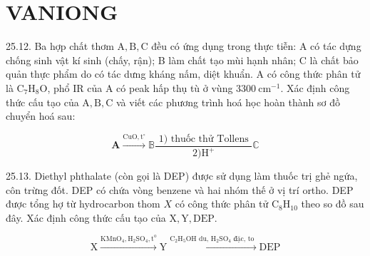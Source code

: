\documentclass[10pt]{article}
\begin{document}
\section*{VANIONG}
25.12. Ba hợp chất thơm $\mathrm{A}, \mathrm{B}, \mathrm{C}$ đều có ứng dụng trong thực tiễn: A có tác dựng chống sinh vật kí sinh (chấy, rận); B làm chất tạo mùi hạnh nhân; C là chất bảo quản thực phẩm do có tác dưng kháng nấm, diệt khuẩn. A có công thức phân tử là $\mathrm{C}_{7} \mathrm{H}_{8} \mathrm{O}$, phổ IR của A có peak hấp thụ tù ở vùng $3300 \mathrm{~cm}^{-1}$. Xác định công thức cấu tạo của $\mathrm{A}, \mathrm{B}, \mathrm{C}$ và viết các phương trình hoá học hoàn thành sơ đồ chuyển hoá sau:

$$
\mathbf{A} \xrightarrow{\mathrm{CuO}, \mathrm{t}^{\circ}} \mathbb{B} \frac{\text { 1) thuốc thử Tollens }}{2) \mathrm{H}^{+}} \mathbb{C}
$$

25.13. Diethyl phthalate (còn gọi là DEP) được sử dụng làm thuốc trị ghẻ ngứa, côn trừng đốt. DEP có chứa vòng benzene và hai nhóm thế ở vị trí ortho. DEP được tổng hợ từ hydrocarbon thom $X$ có công thức phân tử $\mathrm{C}_{8} \mathrm{H}_{10}$ theo so đồ sau đây. Xác định công thức cấu tạo của $\mathrm{X}, \mathrm{Y}, \mathrm{DEP}$.

$$
\mathrm{X} \xrightarrow{\mathrm{KMnO}_{4}, \mathrm{H}_{2} \mathrm{SO}_{4}, \mathrm{t}^{\mathrm{o}}} \mathrm{Y} \xrightarrow{\mathrm{C}_{2} \mathrm{H}_{5} \mathrm{OH} \text { du, } \mathrm{H}_{2} \mathrm{SO}_{4} \text { đặc, to }} \mathrm{DEP}
$$
\end{document}
